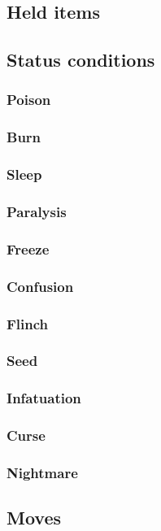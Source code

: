 \subsection{Held items}
\subsection{Status conditions}
\subsubsection{Poison}
\subsubsection{Burn}
\subsubsection{Sleep}
\subsubsection{Paralysis}
\subsubsection{Freeze}
\subsubsection{Confusion}
\subsubsection{Flinch}
\subsubsection{Seed}
\subsubsection{Infatuation}
\subsubsection{Curse}
\subsubsection{Nightmare}
\subsection{Moves}
